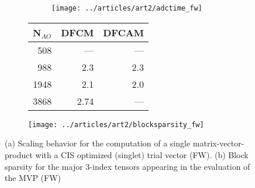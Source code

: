 \begin{figure}

\begin{subfigure}{\textwidth}
\begin{subfigure}{0.45\textwidth}
\centering
\texttt{[image: ../articles/art2/adctime\_fw]}
\end{subfigure}
\hfill
\begin{subtable}{0.45\textwidth}
\centering
\begin{tabular}{rrr}
\hline
N$_{AO}$ & DFCM & DFCAM \\ \hline
508	& ---	& --- \\
988	& 2.3	& 2.3 \\
1948 & 	2.1 &	2.0 \\
3868	 & 2.74 & --- \\
 \hline
\end{tabular}
\end{subtable}
\caption{}
\label{fig:ES_TIME_FW}
\end{subfigure}

\vspace{1.5\baselineskip}

\centering
\begin{subfigure}{0.45\textwidth}
\centering
\texttt{[image: ../articles/art2/blocksparsity\_fw]}
\caption{}
\label{fig:ES_SPARSITY_FW}
\end{subfigure}

\caption[Scaling behavior of CDD-DF-SOS-ADC(2) for FW]{(a) Scaling behavior for the computation of a single matrix-vector-product with a CIS optimized (singlet) trial vector (FW). (b) Block sparsity for the major 3-index tensors appearing in the evaluation of the MVP (FW)}

\end{figure}